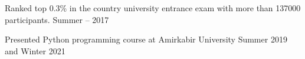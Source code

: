 Ranked  top 0.3\% in the country  university entrance exam with more than 137000 participants.	\hfill Summer -- 2017
 
Presented Python programming course at Amirkabir University 	\hfill Summer 2019 and Winter 2021

